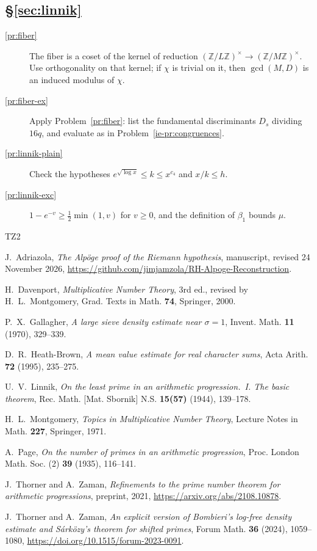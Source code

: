 \documentclass[reqno]{amsart}
\theoremstyle{definition}
\theoremstyle{plain}
\newcommand{\Z}{\mathbb{Z}}
\begin{document}
\subsection*{\S\ref{sec:linnik}}
\begin{description}
\item[\ref{pr:fiber}] The fiber is a coset of the kernel of reduction $(\Z/L\Z)^\times \to (\Z/M\Z)^\times$.  Use orthogonality on that kernel; if $\chi$ is trivial on it, then $\gcd(M, D)$ is an induced modulus of $\chi$.
\item[\ref{pr:fiber-ex}] Apply Problem~\ref{pr:fiber}: list the fundamental discriminants $D_s$ dividing $16q$, and evaluate as in Problem~\ref{ie-pr:congruences}.
\item[\ref{pr:linnik-plain}] Check the hypotheses $e^{\sqrt{\log x}} \le k \le x^{c_4}$ and $x/k \le h$.
\item[\ref{pr:linnik-exc}] $1 - e^{-v} \ge \frac12 \min(1, v)$ for $v \ge 0$, and the definition of $\beta_1$ bounds $\mu$.
\end{description}

\begin{thebibliography}{TZ2}

J.~Adriazola, \emph{The Alp\"oge proof of the Riemann hypothesis}, manuscript, revised 24 November 2026, \url{https://github.com/jimjamzola/RH-Alpoge-Reconstruction}.

H.~Davenport, \emph{Multiplicative Number Theory}, 3rd ed., revised by H.~L.~Montgomery, Grad. Texts in Math. \textbf{74}, Springer, 2000.

P.~X.~Gallagher, \emph{A large sieve density estimate near $\sigma = 1$}, Invent. Math. \textbf{11} (1970), 329--339.

D.~R.~Heath-Brown, \emph{A mean value estimate for real character sums}, Acta Arith. \textbf{72} (1995), 235--275.

U.~V.~Linnik, \emph{On the least prime in an arithmetic progression.~I. The basic theorem}, Rec. Math. [Mat. Sbornik] N.S. \textbf{15(57)} (1944), 139--178.

H.~L.~Montgomery, \emph{Topics in Multiplicative Number Theory}, Lecture Notes in Math. \textbf{227}, Springer, 1971.

A.~Page, \emph{On the number of primes in an arithmetic progression}, Proc. London Math. Soc. (2) \textbf{39} (1935), 116--141.

J.~Thorner and A.~Zaman, \emph{Refinements to the prime number theorem for arithmetic progressions}, preprint, 2021, \url{https://arxiv.org/abs/2108.10878}.

J.~Thorner and A.~Zaman, \emph{An explicit version of Bombieri's log-free density estimate and S\'ark\"ozy's theorem for shifted primes}, Forum Math. \textbf{36} (2024), 1059--1080, \url{https://doi.org/10.1515/forum-2023-0091}.

\end{thebibliography}
\end{document}
